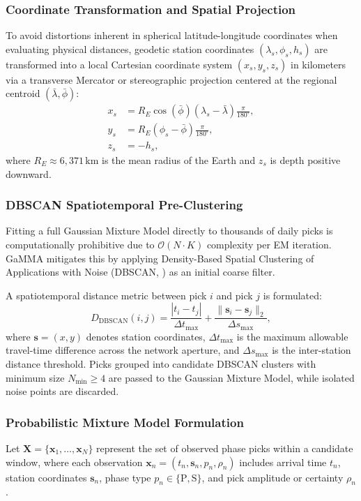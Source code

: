 \subsubsection{Coordinate Transformation and Spatial Projection}
To avoid distortions inherent in spherical latitude-longitude coordinates when evaluating physical distances, geodetic station coordinates $(\lambda_s, \phi_s, h_s)$ are transformed into a local Cartesian coordinate system $(x_s, y_s, z_s)$ in kilometers via a transverse Mercator or stereographic projection centered at the regional centroid $(\bar{\lambda}, \bar{\phi})$:
\begin{align}
  x_s &= R_E \cos(\bar{\phi}) (\lambda_s - \bar{\lambda}) \frac{\pi}{180^{\circ}}, \\
  y_s &= R_E (\phi_s - \bar{\phi}) \frac{\pi}{180^{\circ}}, \\
  z_s &= - h_s,
\end{align}
where $R_E \approx 6{,}371\,\mathrm{km}$ is the mean radius of the Earth and $z_s$ is depth positive downward.

\subsubsection{DBSCAN Spatiotemporal Pre-Clustering}
Fitting a full Gaussian Mixture Model directly to thousands of daily picks is computationally prohibitive due to $\mathcal{O}(N \cdot K)$ complexity per EM iteration. GaMMA mitigates this by applying Density-Based Spatial Clustering of Applications with Noise (\ac{DBSCAN}, \cite{DBSCAN}) as an initial coarse filter.

A spatiotemporal distance metric between pick $i$ and pick $j$ is formulated:
\begin{equation}
  D_{\mathrm{DBSCAN}}(i, j) = \frac{|t_i - t_j|}{\Delta t_{\mathrm{max}}} + \frac{\|\mathbf{s}_i - \mathbf{s}_j\|_2}{\Delta s_{\mathrm{max}}},
\end{equation}
where $\mathbf{s} = (x, y)$ denotes station coordinates, $\Delta t_{\mathrm{max}}$ is the maximum allowable travel-time difference across the network aperture, and $\Delta s_{\mathrm{max}}$ is the inter-station distance threshold. Picks grouped into candidate DBSCAN clusters with minimum size $N_{\mathrm{min}} \ge 4$ are passed to the Gaussian Mixture Model, while isolated noise points are discarded.

\subsubsection{Probabilistic Mixture Model Formulation}
Let $\mathbf{X} = \{\mathbf{x}_1, \dots, \mathbf{x}_N\}$ represent the set of observed phase picks within a candidate window, where each observation $\mathbf{x}_n = (t_n, \mathbf{s}_n, p_n, \rho_n)$ includes arrival time $t_n$, station coordinates $\mathbf{s}_n$, phase type $p_n \in \{\mathrm{P}, \mathrm{S}\}$, and pick amplitude or certainty $\rho_n$.


